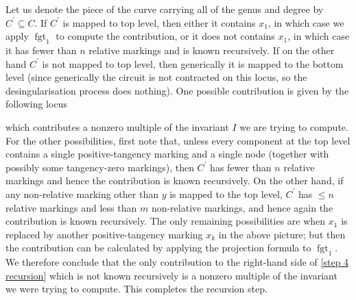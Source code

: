 \documentclass[11pt]{amsart}
\newcommand{\fgt}{\operatorname{fgt}}
\theoremstyle{definition}
\theoremstyle{definition}
\begin{document}
Let us denote the piece of the curve carrying all of the genus and degree by $C^\prime\subseteq C$. If $C^\prime$ is mapped to top level, then either it contains $x_1$, in which case we apply $\fgt_1$ to compute the contribution, or it does not contains $x_1$, in which case it has fewer than $n$ relative markings and is known recursively.  If on the other hand $C^\prime$ is not mapped to top level, then generically it is mapped to the bottom level (since generically the circuit is not contracted on this locus, so the desingularisation process does nothing). One possible contribution is given by the following locus
\begin{center}
\end{center}
which contributes a nonzero multiple of the invariant $I$ we are trying to compute. For the other possibilities, first note that, unless every component at the top level contains a single positive-tangency marking and a single node (together with possibly some tangency-zero markings), then $C^\prime$ has fewer than $n$ relative markings and hence the contribution is known recursively. On the other hand, if any non-relative marking other than $y$ is mapped to the top level, $C^\prime$ has $\leq n$ relative markings and less than $m$ non-relative markings, and hence again the contribution is known recursively. The only remaining possibilities are when $x_1$ is replaced by another positive-tangency marking $x_k$ in the above picture; but then the contribution can be calculated by applying the projection formula to $\fgt_{1}$. We therefore conclude that the only contribution to the right-hand side of \eqref{step 4 recursion} which is not known recursively is a nonzero multiple of the invariant we were trying to compute. This completes the recursion step.
\end{document}
